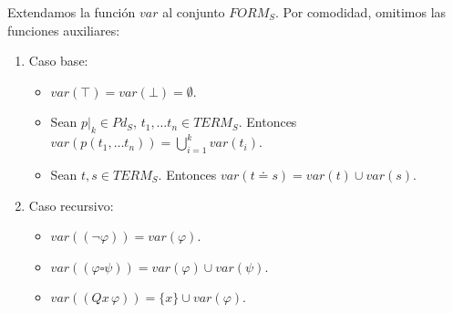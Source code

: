 \begin{example}
Extendamos la función $var$ al conjunto $FORM_S$. Por comodidad, omitimos las funciones auxiliares:
\begin{enumerate}
    \item Caso base:
        \begin{itemize}
            \item $var(\top) = var(\bot) = \emptyset.$
            \item Sean $p|_k \in Pd_S$, $t_1, \dots t_n \in TERM_S$. Entonces $var(p(t_1, \dots t_n)) = \bigcup\limits_{i=1}^{k} var(t_i).$
            \item Sean $t, s \in TERM_S$. Entonces $var(t \doteq s) = var(t) \cup var(s)$.
        \end{itemize} 
    \item Caso recursivo:
        \begin{itemize}
            \item $var((\neg \varphi)) = var(\varphi)$.
            \item $var((\varphi \square \psi)) = var(\varphi) \cup var(\psi)$.
            \item $var((Qx \, \varphi)) = \{x\} \cup var(\varphi)$.
        \end{itemize}
\end{enumerate}
\end{example}

